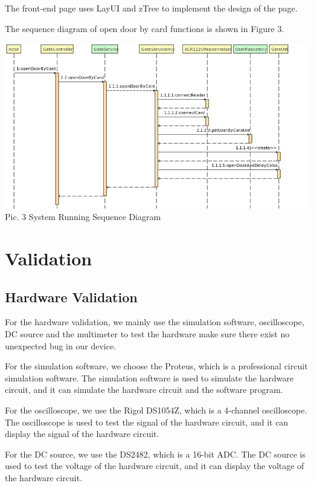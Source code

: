 \documentclass[11pt, a4paper]{article}
\begin{document}
The front-end page uses LayUI and zTree to implement the design of the page. 

The sequence diagram of open door by card functions is shown in Figure 3.

\begin{center}

\includegraphics[scale=0.4]{pic3.png} \\
Pic. 3  System Running Sequence Diagram

\end{center}

\section{Validation}
\subsection{Hardware Validation}

For the hardware validation, we mainly use the simulation software, oscilloscope, DC source and the multimeter to test the hardware make sure there exist no unexpected bug in our device.

For the simulation software, we choose the Proteus, which is a professional circuit simulation software.
The simulation software is used to simulate the hardware circuit, and it can simulate the hardware circuit and the software program.

For the oscilloscope, we use the Rigol DS1054Z, which is a 4-channel oscilloscope.
The oscilloscope is used to test the signal of the hardware circuit, and it can display the signal of the hardware circuit.

For the DC source, we use the DS2482, which is a 16-bit ADC.
The DC source is used to test the voltage of the hardware circuit, and it can display the voltage of the hardware circuit.
\end{document}
